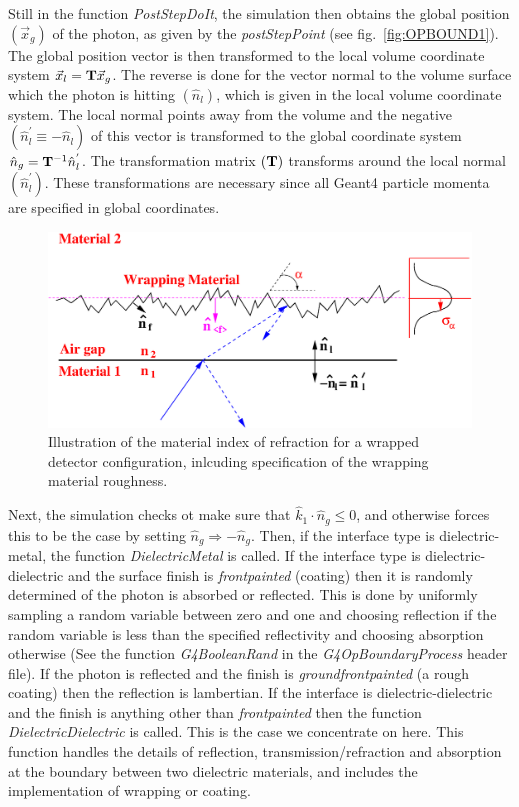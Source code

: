 Still in the function {\em PostStepDoIt}, the simulation then obtains
the global position $(\vec{x}_g)$ of the photon, as given by the {\em
postStepPoint} (see fig.~\ref{fig:OPBOUND1}).  The global position
vector is then transformed to the local volume coordinate system
$\vec{x}_l = {\bf T} \vec{x}_g$. The reverse is done for the vector
normal to the volume surface which the photon is hitting
$(\hat{n}_l)$, which is given in the local volume coordinate
system. The local normal points away from the volume and the negative
$(\hat{n}^{'}_l \equiv -\hat{n}_l)$ of this vector is transformed to
the global coordinate system $\hat{n}_g = {\bf T}^{-1}\hat{n}^{'}_l$.
The transformation matrix $({\bf T})$ transforms around the local
normal $(\hat{n}^{'}_l)$. These transformations are necessary since
all Geant4 particle momenta are specified in global coordinates.

\begin{figure}[h]
  \hspace{4cm}
  \includegraphics[scale=0.3]{./figures5/WrappingFig.eps}
  \caption{Illustration of the material index of refraction for
           a wrapped detector configuration, inlcuding specification
           of the wrapping material roughness.}
           \label{fig:OPBOUND3}
\end{figure}

Next, the simulation checks ot make sure that $\hat{k}_1 \cdot
\hat{n}_g \leq 0$, and otherwise forces this to be the case by setting
$\hat{n}_g \Rightarrow -\hat{n}_g$.  Then, if the interface type is
dielectric-metal, the function {\em DielectricMetal} is called. If the
interface type is dielectric-dielectric and the surface finish is {\em
frontpainted} (coating) then it is randomly determined of the photon
is absorbed or reflected. This is done by uniformly sampling a random
variable between zero and one and choosing reflection if the random
variable is less than the specified reflectivity and choosing
absorption otherwise (See the function {\em G4BooleanRand} in the {\em
G4OpBoundaryProcess} header file). If the photon is reflected and the
finish is {\em groundfrontpainted} (a rough coating) then the
reflection is lambertian. If the interface is dielectric-dielectric
and the finish is anything other than {\em frontpainted } then the
function {\em DielectricDielectric} is called. This is the case we
concentrate on here. This function handles the details of reflection,
transmission/refraction and absorption at the boundary between two
dielectric materials, and includes the implementation of wrapping
or coating.

